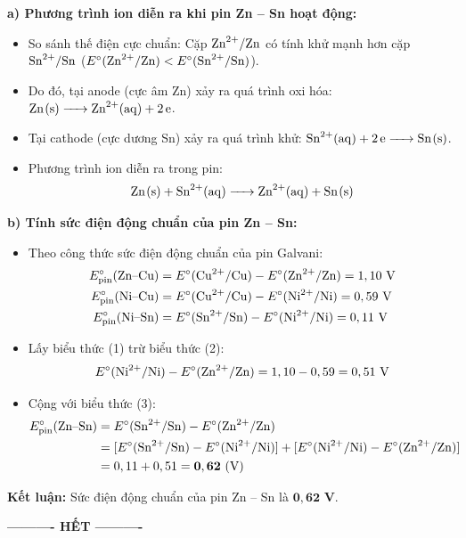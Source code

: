 \documentclass[11pt,a4paper]{article}
\begin{document}
\begin{tcolorbox}[colback=tableGreen!30,colframe=mainGreen!70,title=\textbf{Hướng dẫn giải chi tiết Câu 3},fonttitle=\bfseries]
\textbf{a) Phương trình ion diễn ra khi pin Zn -- Sn hoạt động:}
\begin{itemize}[leftmargin=15pt,itemsep=1pt]
\item So sánh thế điện cực chuẩn: Cặp $\ce{Zn^2+}/\ce{Zn}$ có tính khử mạnh hơn cặp $\ce{Sn^2+}/\ce{Sn}$ ($E^\circ(\ce{Zn^2+}/\ce{Zn}) < E^\circ(\ce{Sn^2+}/\ce{Sn})$).
\item Do đó, tại anode (cực âm Zn) xảy ra quá trình oxi hóa: $\ce{Zn(s) -> Zn^2+(aq) + 2e}$.
\item Tại cathode (cực dương Sn) xảy ra quá trình khử: $\ce{Sn^2+(aq) + 2e -> Sn(s)}$.
\item Phương trình ion diễn ra trong pin:
\[
\ce{Zn(s) + Sn^2+(aq) -> Zn^2+(aq) + Sn(s)}
\]
\end{itemize}

\textbf{b) Tính sức điện động chuẩn của pin Zn -- Sn:}
\begin{itemize}[leftmargin=15pt,itemsep=1pt]
\item Theo công thức sức điện động chuẩn của pin Galvani:
\begin{align}
E^\circ_\text{pin}(\text{Zn--Cu}) &= E^\circ(\ce{Cu^2+}/\ce{Cu}) - E^\circ(\ce{Zn^2+}/\ce{Zn}) = 1,10\text{ V} \\
E^\circ_\text{pin}(\text{Ni--Cu}) &= E^\circ(\ce{Cu^2+}/\ce{Cu}) - E^\circ(\ce{Ni^2+}/\ce{Ni}) = 0,59\text{ V} \\
E^\circ_\text{pin}(\text{Ni--Sn}) &= E^\circ(\ce{Sn^2+}/\ce{Sn}) - E^\circ(\ce{Ni^2+}/\ce{Ni}) = 0,11\text{ V}
\end{align}
\item Lấy biểu thức (1) trừ biểu thức (2):
\[
E^\circ(\ce{Ni^2+}/\ce{Ni}) - E^\circ(\ce{Zn^2+}/\ce{Zn}) = 1,10 - 0,59 = 0,51\text{ V}
\]
\item Cộng với biểu thức (3):
\begin{align*}
E^\circ_\text{pin}(\text{Zn--Sn}) &= E^\circ(\ce{Sn^2+}/\ce{Sn}) - E^\circ(\ce{Zn^2+}/\ce{Zn}) \\
&= [E^\circ(\ce{Sn^2+}/\ce{Sn}) - E^\circ(\ce{Ni^2+}/\ce{Ni})] + [E^\circ(\ce{Ni^2+}/\ce{Ni}) - E^\circ(\ce{Zn^2+}/\ce{Zn})] \\
&= 0,11 + 0,51 = \mathbf{0,62\text{ (V)}}
\end{align*}
\end{itemize}
\textbf{Kết luận:} Sức điện động chuẩn của pin Zn -- Sn là $\mathbf{0,62\text{ V}}$.
\end{tcolorbox}

\vfill
\begin{center}
\textbf{---------- HẾT ----------}
\end{center}
\end{document}
